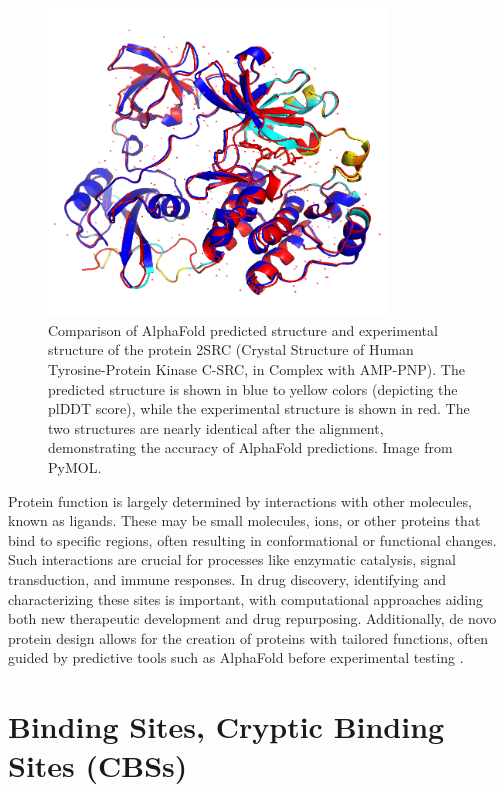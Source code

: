 \begin{figure}[ht]
    \centering
    \includegraphics[width=0.8\textwidth]{img/alphafold_vs_exp.png}
    \caption{Comparison of AlphaFold predicted structure and experimental structure of the protein 2SRC (Crystal Structure of Human Tyrosine-Protein Kinase C-SRC, in Complex with AMP-PNP). The predicted structure is shown in blue to yellow colors (depicting the plDDT score), while the experimental structure is shown in red. The two structures are nearly identical after the alignment, demonstrating the accuracy of AlphaFold predictions. Image from PyMOL.}
    \label{fig:alphafold-vs-exp}
\end{figure}
\par

Protein function is largely determined by interactions with other molecules, known as ligands. These may be small molecules, ions, or other proteins that bind to specific regions, often resulting in conformational or functional changes. Such interactions are crucial for processes like enzymatic catalysis, signal transduction, and immune responses. In drug discovery, identifying and characterizing these sites is important, with computational approaches aiding both new therapeutic development and drug repurposing. Additionally, de novo protein design allows for the creation of proteins with tailored functions, often guided by predictive tools such as AlphaFold before experimental testing \cite{huang2016coming}.

\section{Binding Sites, Cryptic Binding Sites (CBSs)}
\label{sec:binding-sites}


